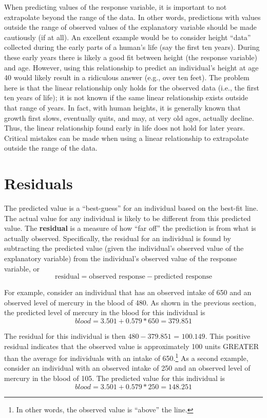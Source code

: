 \documentclass[10pt,openany]{book}\usepackage[]{graphicx}\usepackage[]{color}
\begin{document}
\vspace{12pt} %
When predicting values of the response variable, it is important to not extrapolate beyond the range of the data. In other words, predictions with values outside the range of observed values of the explanatory variable should be made cautiously (if at all). An excellent example would be to consider height ``data'' collected during the early parts of a human's life (say the first ten years). During these early years there is likely a good fit between height (the response variable) and age. However, using this relationship to predict an individual's height at age 40 would likely result in a ridiculous answer (e.g., over ten feet). The problem here is that the linear relationship only holds for the observed data (i.e., the first ten years of life); it is not known if the same linear relationship exists outside that range of years. In fact, with human heights, it is generally known that growth first slows, eventually quits, and may, at very old ages, actually decline. Thus, the linear relationship found early in life does not hold for later years. Critical mistakes can be made when using a linear relationship to extrapolate outside the range of the data.

\section{Residuals}
The predicted value is a ``best-guess'' for an individual based on the best-fit line. The actual value for any individual is likely to be different from this predicted value. The \textbf{residual} is a measure of how ``far off'' the prediction is from what is actually observed. Specifically, the residual for an individual is found by subtracting the predicted value (given the individual's observed value of the explanatory variable) from the individual's observed value of the response variable, or
  \[ \text{residual}=\text{observed response}-\text{predicted response} \]

For example, consider an individual that has an observed intake of 650 and an observed level of mercury in the blood of 480. As shown in the previous section, the predicted level of mercury in the blood for this individual is
  \[ blood = 3.501 + 0.579*650 = 379.851 \]

The residual for this individual is then $480-379.851$ = $100.149$. This positive residual indicates that the observed value is approximately 100 units GREATER than the average for individuals with an intake of 650.\footnote{In other words, the observed value is ``above'' the line.}  As a second example, consider an individual with an observed intake of 250 and an observed level of mercury in the blood of 105. The predicted value for this individual is
  \[ blood = 3.501 + 0.579*250 = 148.251 \]
\end{document}
